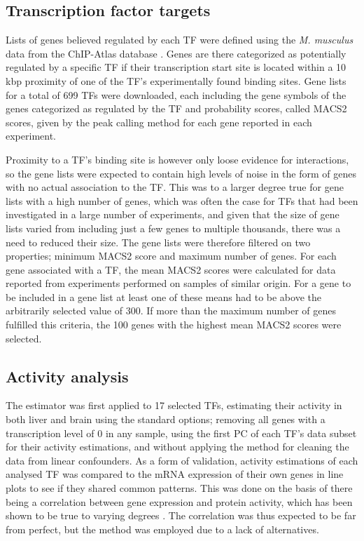 \subsection{Transcription factor targets}

Lists of genes believed regulated by each \ac{TF} were defined using the \textit{M. musculus} data from the ChIP-Atlas database \cite{Oki2018}. Genes are there categorized as potentially regulated by a specific \ac{TF} if their transcription start site is located within a 10 kbp proximity of one of the \ac{TF}'s experimentally found binding sites. Gene lists for a total of 699 \acp{TF} were downloaded, each including the gene symbols of the genes categorized as regulated by the \ac{TF} and probability scores, called MACS2 scores, given by the peak calling method for each gene reported in each experiment. 

Proximity to a \ac{TF}'s binding site is however only loose evidence for interactions, so the gene lists were expected to contain high levels of noise in the form of genes with no actual association to the \ac{TF}. This was to a larger degree true for gene lists with a high number of genes, which was often the case for \acp{TF} that had been investigated in a large number of experiments, and given that the size of gene lists varied from including just a few genes to multiple thousands, there was a need to reduced their size. The gene lists were therefore filtered on two properties; minimum MACS2 score and maximum number of genes. For each gene associated with a \ac{TF}, the mean MACS2 scores were calculated for data reported from experiments performed on samples of similar origin. For a gene to be included in a gene list at least one of these means had to be above the arbitrarily selected value of 300. If more than the maximum number of genes fulfilled this criteria, the 100 genes with the highest mean MACS2 scores were selected.

\subsection{Activity analysis}

The estimator was first applied to 17 selected \acp{TF}, estimating their activity in both liver and brain using the standard options; removing all genes with a transcription level of 0 in any sample, using the first \ac{PC} of each \ac{TF}'s data subset for their activity estimations, and without applying the method for cleaning the data from linear confounders. As a form of validation, activity estimations of each analysed \ac{TF} was compared to the mRNA expression of their own genes in line plots to see if they shared common patterns. This was done on the basis of there being a correlation between gene expression and protein activity, which has been shown to be true to varying degrees \cite{Liu2016}. The correlation was thus expected to be far from perfect, but the method was employed due to a lack of alternatives. 

